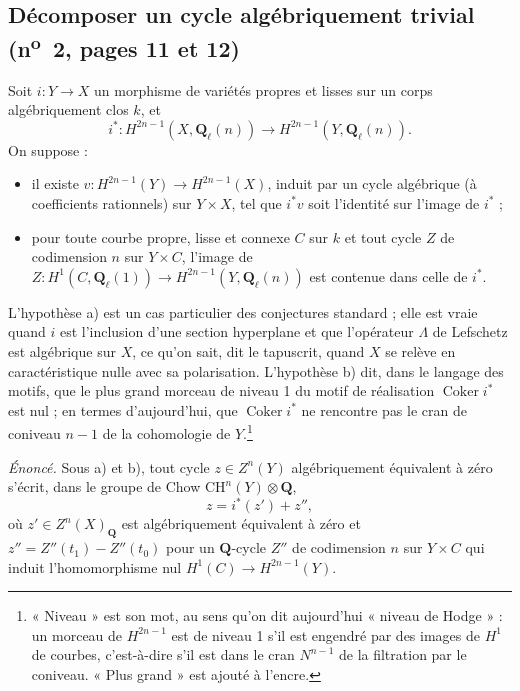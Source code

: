 \documentclass[11pt,a4paper]{article}
\begin{document}
\subsection*{Décomposer un cycle algébriquement trivial (n\textsuperscript{o}~2, pages 11 et 12)}

Soit $i\colon Y \to X$ un morphisme de variétés propres et lisses sur un corps
algébriquement clos $k$, et
\[ i^*\colon H^{2n-1}(X, \mathbf{Q}_\ell(n)) \to H^{2n-1}(Y, \mathbf{Q}_\ell(n)). \]
On suppose :
\begin{itemize}
\item[a)] il existe $v\colon H^{2n-1}(Y) \to H^{2n-1}(X)$, induit par un cycle
algébrique (à coefficients rationnels) sur $Y \times X$, tel que $i^* v$ soit
l'identité sur l'image de $i^*$ ;
\item[b)] pour toute courbe propre, lisse et connexe $C$ sur $k$ et tout cycle
$Z$ de codimension $n$ sur $Y \times C$, l'image de
$Z\colon H^1(C, \mathbf{Q}_\ell(1)) \to H^{2n-1}(Y, \mathbf{Q}_\ell(n))$ est
contenue dans celle de $i^*$.
\end{itemize}
L'hypothèse a) est un cas particulier des conjectures standard ; elle est vraie
quand $i$ est l'inclusion d'une section hyperplane et que l'opérateur $\Lambda$
de Lefschetz est algébrique sur $X$, ce qu'on sait, dit le tapuscrit, quand $X$
se relève en caractéristique nulle avec sa polarisation. L'hypothèse b) dit,
dans le langage des motifs, que le plus grand morceau de niveau 1 du motif de
réalisation $\operatorname{Coker} i^*$ est nul ; en termes d'aujourd'hui, que
$\operatorname{Coker} i^*$ ne rencontre pas le cran de coniveau $n-1$ de la
cohomologie de $Y$.\footnote{« Niveau » est son mot, au sens qu'on dit
aujourd'hui « niveau de Hodge » : un morceau de $H^{2n-1}$ est de niveau 1 s'il
est engendré par des images de $H^1$ de courbes, c'est-à-dire s'il est dans le
cran $N^{n-1}$ de la filtration par le coniveau. « Plus grand » est ajouté à
l'encre.}

\emph{Énoncé.} Sous a) et b), tout cycle $z \in Z^n(Y)$ algébriquement équivalent
à zéro s'écrit, dans le groupe de Chow $\mathrm{CH}^n(Y) \otimes \mathbf{Q}$,
\[ z = i^*(z') + z'' , \]
où $z' \in Z^n(X)_{\mathbf{Q}}$ est algébriquement équivalent à zéro et
$z'' = Z''(t_1) - Z''(t_0)$ pour un $\mathbf{Q}$-cycle $Z''$ de codimension $n$
sur $Y \times C$ qui induit l'homomorphisme nul $H^1(C) \to H^{2n-1}(Y)$.
\end{document}
